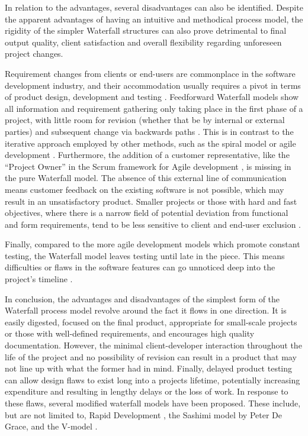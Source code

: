 In relation to the advantages, several disadvantages can also be identified.  Despite the apparent advantages of having an intuitive and methodical process model, the rigidity of the simpler Waterfall structures can also prove detrimental to final output quality, client satisfaction and overall flexibility regarding unforeseen project changes.

Requirement changes from clients or end-users are commonplace in the software development industry, and their accommodation usually requires a pivot in terms of product design, development and testing \cite{Parnas}. Feedforward Waterfall models show all information and requirement gathering only taking place in the first phase of a project, with little room for revision (whether that be by internal or external parties) and subsequent change via backwards paths \cite{Weisert}. This is in contrast to the iterative approach employed by other methods, such as the spiral model \cite{Boehm_2000} or agile development \cite{Beck}. Furthermore, the addition of a customer representative, like the “Project Owner” in the Scrum framework for Agile development \cite{Schwaber}, is missing in the pure Waterfall model. The absence of this external line of communication means customer feedback on the existing software is not possible, which may result in an unsatisfactory product. Smaller projects or those with hard and fast objectives, where there is a narrow field of potential deviation from functional and form requirements, tend to be less sensitive to client and end-user exclusion \cite{Lucidchart}.

Finally, compared to the more agile development models which promote constant testing, the Waterfall model leaves testing until late in the piece. This means difficulties or flaws in the software features can go unnoticed deep into the project’s timeline \cite{McConnell_2004}.

In conclusion, the advantages and disadvantages of the simplest form of the Waterfall process model revolve around the fact it flows in one direction. It is easily digested, focused on the final product, appropriate for small-scale projects or those with well-defined requirements, and encourages high quality documentation. However, the minimal client-developer interaction throughout the life of the project and no possibility of revision can result in a product that may not line up with what the former had in mind. Finally, delayed product testing can allow design flaws to exist long into a projects lifetime, potentially increasing expenditure and resulting in lengthy delays or the loss of work. In response to these flaws, several modified waterfall models have been proposed. These include, but are not limited to, Rapid Development \cite{McConnell_1996}, the Sashimi model by Peter De Grace, and the V-model \cite{Fosberg}.


